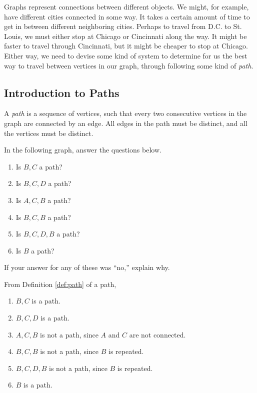 \documentclass[11pt]{article}
\begin{document}
Graphs represent connections between different objects. We might, for example, have different cities connected in some way.
It takes a certain amount of time to get in between different neighboring cities. Perhaps to travel from D.C. to St. Louis,
we must either stop at Chicago or Cincinnati along the way. It might be faster to travel through Cincinnati, but it might be
cheaper to stop at Chicago. Either way, we need to devise some kind of system to determine for us the best way to travel between
vertices in our graph, through following some kind of \textit{path}.

\subsection{Introduction to Paths}

\begin{definition}
\label{def:path}
A \textit{path} is a sequence of vertices, such that every two consecutive vertices in the graph are connected by an edge.
All edges in the path must be distinct, and all the vertices must be distinct.
\end{definition}

\begin{problem} %
In the following graph, answer the questions below.
\begin{center}
\end{center}
\begin{enumerate}[label=(\alph*)]
\item Is $B,C$ a path?
\item Is $B,C,D$ a path?
\item Is $A,C,B$ a path?
\item Is $B,C,B$ a path?
\item Is $B,C,D,B$ a path?
\item Is $B$ a path?
\end{enumerate}
If your answer for any of these was ``no,'' explain why.
\end{problem}

\begin{solution}
From Definition \ref{def:path} of a path,
\begin{enumerate}[label=(\alph*)]
\item $B,C$ is a path.
\item $B,C,D$ is a path.
\item $A,C,B$ is not a path, since $A$ and $C$ are not connected.
\item $B,C,B$ is not a path, since $B$ is repeated.
\item $B,C,D,B$ is not a path, since $B$ is repeated.
\item $B$ is a path.
\end{enumerate}
\end{solution}
\end{document}
